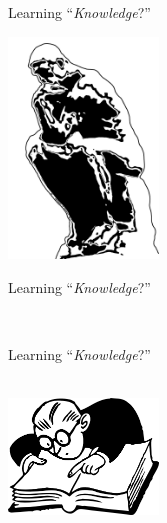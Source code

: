 
\def\title{Learning ``\textit{Knowledge}?''}
\begin{frame}{\title}
\begin{center}
\includegraphics[width=4cm]{../img/philosopher.png}
\end{center}
\end{frame}


\begin{frame}[noframenumbering]{\title}
\begin{center}
 \\
\vspace{5ex}
\treeBlank
\end{center}
\end{frame}


\begin{frame}[noframenumbering]{\title}
\begin{center}
 \\
\vspace{5ex}
\includegraphics[width=4cm]{../img/facts.png}
\end{center}
\end{frame}



